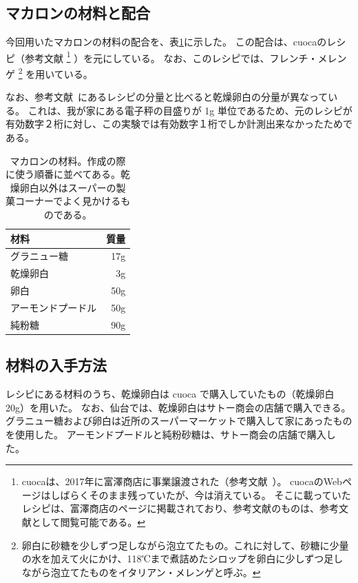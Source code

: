 \documentclass[uplatex,dvipdfmx,a4j,12pt]{jsarticle}
\begin{document}
\subsection{マカロンの材料と配合}

今回用いたマカロンの材料の配合を、表\ref{table:recipe}に示した。
この配合は、cuocaのレシピ（参考文献\cite{cuoca}
\footnote{
    cuocaは、2017年に富澤商店に事業譲渡された（参考文献~\cite{cuoca-tomiz}）。
    cuocaのWebページはしばらくそのまま残っていたが、今は消えている。
    そこに載っていたレシピは、富澤商店のページに掲載されており、参考文献\cite{cuoca}のものは、参考文献\cite{tomiz}として閲覧可能である。
}
）を元にしている。 
なお、このレシピでは、フレンチ・メレンゲ
\footnote{
    卵白に砂糖を少しずつ足しながら泡立てたもの。これに対して、砂糖に少量の水を加えて火にかけ、118℃まで煮詰めたシロップを卵白に少しずつ足しながら泡立てたものをイタリアン・メレンゲと呼ぶ。
}
を用いている。 

なお、参考文献~\cite{cuoca}にあるレシピの分量と比べると乾燥卵白の分量が異なっている。 
これは、我が家にある電子秤の目盛りが 1g 単位であるため、元のレシピが有効数字２桁に対し、この実験では有効数字１桁でしか計測出来なかったためである。

\begin{table}[t]
    \centering
    \caption{マカロンの材料。作成の際に使う順番に並べてある。乾燥卵白以外はスーパーの製菓コーナーでよく見かけるものである。}
    \begin{tabular}{lr}
        材料              & 質量 \\
        \hline
        グラニュー糖      & 17g \\
        乾燥卵白         & 3g \\
        卵白             & 50g \\
        アーモンドプードル & 50g \\
        純粉糖 & 90g \\
        \hline
    \end{tabular}
    \label{table:recipe}
\end{table}

\subsection{材料の入手方法}

レシピにある材料のうち、乾燥卵白は cuoca で購入していたもの（乾燥卵白20g）を用いた。
なお、仙台では、乾燥卵白はサトー商会の店舗で購入できる。
グラニュー糖および卵白は近所のスーパーマーケットで購入して家にあったものを使用した。 
アーモンドプードルと純粉砂糖は、サトー商会の店舗で購入した。
\end{document}
